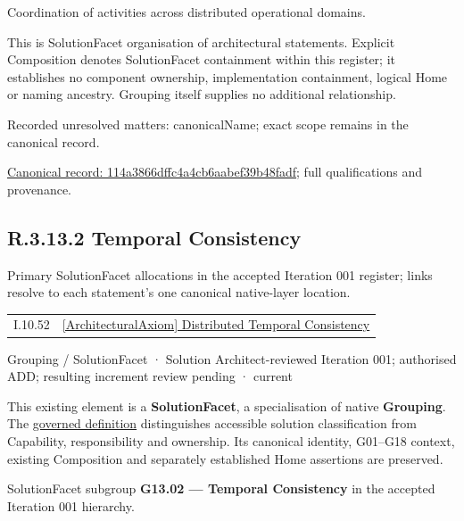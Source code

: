 Coordination of activities across distributed operational domains.



This is SolutionFacet organisation of architectural statements. Explicit Composition denotes SolutionFacet containment within this register; it establishes no component ownership, implementation containment, logical Home or naming ancestry. Grouping itself supplies no additional relationship.


{\small Recorded unresolved matters: canonicalName; exact scope remains in the canonical record.}\par
{\footnotesize \href{../../../../../../../continuum/grouping/114a3866dffc4a4cb6aabef39b48fadf.md}{Canonical record: 114a3866dffc4a4cb6aabef39b48fadf}; full qualifications and provenance.}\par
\subsection*{R.3.13.2 Temporal Consistency}
\label{navigation:R.3.13.2}

Primary SolutionFacet allocations in the accepted Iteration 001 register; links resolve to each statement’s one canonical native-layer location.\par
\begin{longtable}{p{.22\linewidth}p{.73\linewidth}}
I.10.52 & \hyperref[element:ed3e8d7923d14f8cbc6f08d3673248f2]{[ArchitecturalAxiom] Distributed Temporal Consistency} \\
\end{longtable}
\label{element:0f1014c80b0a473abf8c37845e0ed2fa}
{\small Grouping / SolutionFacet · Solution Architect-reviewed Iteration 001; authorised ADD; resulting increment review pending · current}\par

This existing element is a \textbf{SolutionFacet}, a specialisation of native
\textbf{Grouping}. The \href{\detokenize{../../../../../../../governance/continuum-representation.md#solutionfacet-classification--1119-candidate}}{governed definition}
distinguishes accessible solution classification from Capability, responsibility
and ownership. Its canonical identity, G01–G18 context, existing Composition
and separately established Home assertions are preserved.



SolutionFacet subgroup \textbf{G13.02 — Temporal Consistency} in the accepted Iteration 001 hierarchy.



